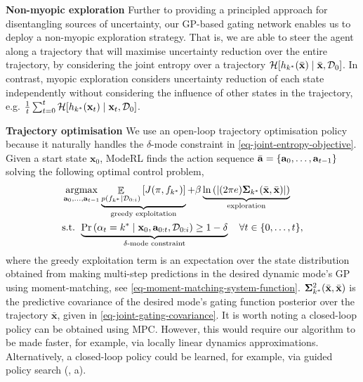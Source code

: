 \documentclass[twoside]{article}
\DeclareMathOperator{\E}{\mathbb{E}}
\newcommand{\state}{\ensuremath{\mathbf{x}}}
\newcommand{\dataset}{\ensuremath{\mathcal{D}}}
\newcommand{\modeVar}{\ensuremath{\alpha}}
\newcommand{\gatingFunc}{\ensuremath{h}}
\DeclareMathOperator*{\argmax}{argmax}
\begin{document}
\textbf{Non-myopic exploration}
Further to providing a principled approach for disentangling sources of uncertainty, our GP-based gating network enables us to deploy a non-myopic exploration strategy.
That is, we are able to steer the agent along a trajectory that will maximise uncertainty reduction over the entire trajectory,
by considering the joint entropy over a trajectory \(\mathcal{H}[\gatingFunc_{\desiredMode}(\stateTraj) \mid \stateTraj, \dataset_{0}]\).
In contrast, myopic exploration considers uncertainty reduction of each state independently without considering the influence of other states in the trajectory,
e.g. \(\frac{1}{\TimeInd}\sum_{\timeInd=0}^{\TimeInd}\mathcal{H}[\gatingFunc_{\desiredMode}(\state_{\timeInd}) \mid \state_{\timeInd}, \dataset_{0}]\).

\textbf{Trajectory optimisation}
We use an open-loop trajectory optimisation policy because it naturally handles the \(\delta\text{-mode}\) constraint
in \cref{eq-joint-entropy-objective}.
Given a start state \(\state_{0}\), ModeRL finds the action sequence \(\bar{\mathbf{a}} = \{\mathbf{a}_{0},\ldots,\mathbf{a}_{\relax{\ensuremath{t}}-1}\}\) solving the following optimal control problem,
\begin{subequations} \label{eq-trajectory-optimisation}
\begin{align}
&\argmax_{\action_{0}, \ldots, \action_{\TimeInd-1}}
\underbrace{\E_{p(\dynamicsFunc_{\desiredMode} \mid \dataset_{0:i})} \left[ J(\pi, \dynamicsFunc_{\desiredMode}) \right]}_{\text{greedy exploitation}}
+ \beta \underbrace{\ln \left( | (2\pi e) \bm\Sigma_{\desiredMode}(\bar{\state}, \bar{\state}) | \right)}_{\text{exploration}} \\
&\text{s.t. } \underbrace{ \Pr \left(\modeVar_{\timeInd} = \desiredMode \mid \state_{0}, \action_{0:t}, \mathcal{D}_{0:i} \right)
\geq 1-\delta}_{\delta\text{-mode constraint}} \quad \forall \timeInd \in \{0,\ldots, \TimeInd\}, \label{eq-constraint-approx}
\end{align}
\end{subequations}
where the greedy exploitation term is an expectation over the state distribution obtained from making multi-step predictions
in the desired dynamic mode's GP using moment-matching, see \cref{eq-moment-matching-system-function}.
\(\bm\Sigma^{2}_{\desiredMode}(\bar{\state},\bar{\state})\) is the predictive covariance of the desired mode's
gating function posterior over the trajectory \(\bar{\state}\), given in \cref{eq-joint-gating-covariance}.
It is worth noting a closed-loop policy can be obtained using MPC.
However, this would require our algorithm to be made faster,
for example, via locally linear dynamics approximations.
Alternatively, a closed-loop policy could be learned, for example, via guided policy search (, a).
\end{document}
